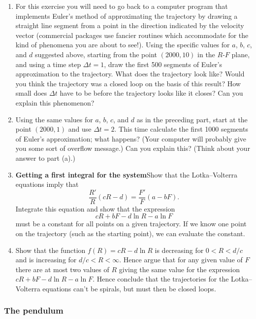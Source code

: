 \begin{enumerate}
\begin{enumerate}
  \item For this exercise you will need to go back to a computer program
that implements Euler's method of approximating the trajectory by
drawing a straight line segment from a point in the direction
indicated by the velocity vector (commercial packages use fancier
routines which accommodate for the kind of phenomena you are about to
see!). Using the specific values for $a$, $b$, $c$, and $d$ suggested
above, starting from the point $(2000, 10)$ in the $R$-$F$ plane, and
using a time step $\Delta t=1$, draw the first 500 segments of Euler's
approximation to the trajectory.  What does the trajectory look like?
Would you think the trajectory was a closed loop on the basis of this
result?  How small does $\Delta t$ have to be before the trajectory
looks like it closes?  Can you explain this phenomenon?

  \item Using
the same values for $a$, $b$, $c$, and $d$ as in the preceding part,
start at the point $(2000, 1)$ and use $\Delta t=2$.  This time
calculate the first 1000 segments of Euler's approximation; what
happens? (Your computer will probably give you some sort of overflow
message.) Can you explain this? (Think about your answer to part (a).)


  \item {\bf Getting a first integral for the system}\quad Show
that the Lotka--Volterra equations imply that
\[
\dfrac{R'}{R}(cR-d) = \dfrac{F'}{F}(a-bF).
\]
Integrate this equation and show that the expression
\[
cR+bF-d\ln{R} - a \ln{F}
\]
must be a constant for all points on a given trajectory.  If we know
one point on the trajectory (such as the starting point), we can
evaluate the constant.

  \item Show that the function $f(R)=cR-d\ln R$
is decreasing for $0<R<d/c$ and is increasing for
$d/c<R<\infty$. Hence argue that for any given value of $F$ there are
at most two values of $R$ giving the same value for the expression
$cR+bF-d\ln R-a\ln F$.  Hence conclude that the trajectories for the
Lotka--Volterra equations can't be spirals, but must then be closed
loops.

\end{enumerate}
\end{enumerate}
\subsubsection{The pendulum}
\label{subsubsec:the-pendulum}




